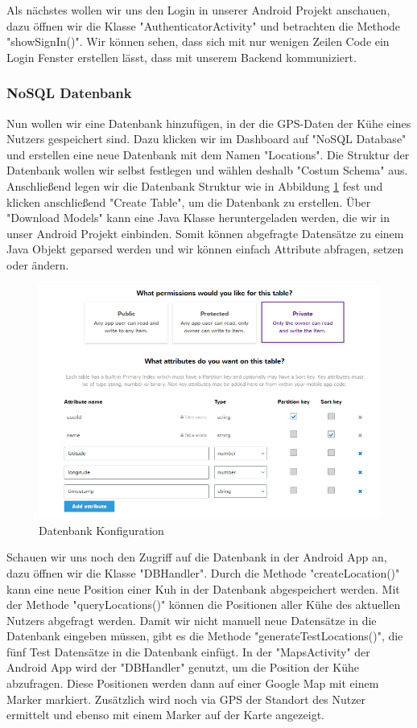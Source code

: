 Als nächstes wollen wir uns den Login in unserer Android Projekt anschauen, dazu öffnen wir die Klasse "AuthenticatorActivity" und betrachten die Methode "showSignIn()". Wir können sehen, dass sich mit nur wenigen Zeilen Code ein Login Fenster erstellen lässt, dass mit unserem Backend kommuniziert.

\subsubsection{NoSQL Datenbank}
Nun wollen wir eine Datenbank hinzufügen, in der die GPS-Daten der Kühe eines Nutzers gespeichert sind. Dazu klicken wir im Dashboard auf "NoSQL Database" und erstellen eine neue Datenbank mit dem Namen "Locations". Die Struktur der Datenbank wollen wir selbst festlegen und wählen deshalb "Costum Schema" aus. Anschließend legen wir die Datenbank Struktur wie in Abbildung \ref{fig:nosqldatabasesetup} fest und klicken anschließend "Create Table", um die Datenbank zu erstellen. Über "Download Models" kann eine Java Klasse heruntergeladen werden, die wir in unser Android Projekt einbinden. Somit können abgefragte Datensätze zu einem Java Objekt geparsed werden und wir können einfach Attribute abfragen, setzen oder ändern.

\begin{figure}[h!]
	\centering
	\includegraphics[width=1\linewidth]{Pictures/NoSQLDatabaseSetup}
	\caption[Datenbank Konfiguration]{Datenbank Konfiguration}
	\label{fig:nosqldatabasesetup}
\end{figure}

Schauen wir uns noch den Zugriff auf die Datenbank in der Android App an, dazu öffnen wir die Klasse "DBHandler". Durch die Methode "createLocation()" kann eine neue Position einer Kuh in der Datenbank abgespeichert werden. Mit der Methode "queryLocations()" können die Positionen aller Kühe des aktuellen Nutzers abgefragt werden. Damit wir nicht manuell neue Datensätze in die Datenbank eingeben müssen, gibt es die Methode "generateTestLocations()", die fünf Test Datensätze in die Datenbank einfügt. In der "MapsActivity" der Android App wird der "DBHandler" genutzt, um die Position der Kühe abzufragen. Diese Positionen werden dann auf einer Google Map mit einem Marker markiert. Zusätzlich wird noch via GPS der Standort des Nutzer ermittelt und ebenso mit einem Marker auf der Karte angezeigt. 


